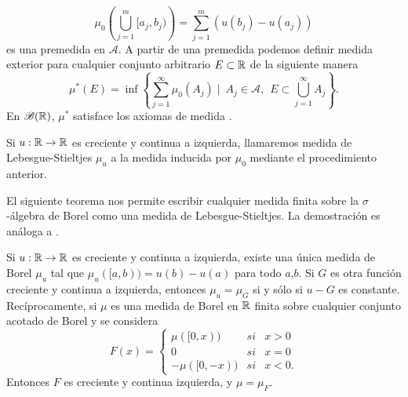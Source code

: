 $$\mu_{0}\left( \bigcup_{j=1}^m[a_j,b_j)\right)  =\sum_{j=1}^{m}\left(u(b_j)-u(a_j)\right) $$
es una premedida  en $\mathcal{A}$. A partir de una premedida podemos definir  medida exterior para cualquier conjunto arbitrario $E\subset\mathbb{R}$  de la siguiente manera 
$$\mu^{*}(E)=\inf\left\lbrace \sum_{ j=1 }^{\infty}\mu_{0}(A_j) \mid \ A_j\in \mathcal{A}, \ \  E\subset\bigcup_{j=1}^{\infty}A_j \right\rbrace. $$\index[Simbolo]{$\mu^{*}$}En $\mathscr{B}(\mathbb{R})$, $\mu^{*}$ satisface los axiomas de medida \cite[Proposición 1.13]{folland}.
\begin{defi}
	Si $u:\mathbb{R} \to \mathbb{R}$ es creciente y continua a izquierda, llamaremos medida de Lebesgue-Stieltjes $\mu_{u}$ a la medida inducida por $\mu_{0}$ mediante el procedimiento anterior. 
\end{defi}

El siguiente teorema nos permite escribir cualquier medida finita sobre la $\sigma$-álgebra de Borel como una medida de Lebesgue-Stieltjes. La demostración es análoga a  \cite[Teorema  1.16]{folland}.

\begin{thm}\label{medidas}
	Si $u:\mathbb{R} \to\mathbb{R}$ es creciente y continua a izquierda, existe una única medida de Borel $\mu_{u}$ tal que $\mu_{u}([a,b))=u(b)-u(a)$ para todo $a$,$b$. Si $G$ es otra función creciente y continua a izquierda, entonces  $\mu_{u}=\mu_{G}$ si y sólo si $u-G$ es constante. Recíprocamente, si $\mu$ es una medida de Borel  en $\mathbb{R}$ finita sobre cualquier conjunto acotado de Borel y se considera
	$$F(x)= \left\{ \begin{array}{lcc}
		\mu([0,x)) &   si  & x > 0 \\
		0 &   si& x = 0 \\
		-\mu([0,-x)) &   si  & x < 0. 
	\end{array}
	\right. $$
	Entonces $F$ es creciente y continua izquierda, y $\mu=\mu_{F}$.
\end{thm}  




%

